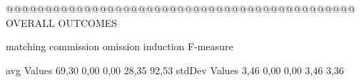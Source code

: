 @@@@@@@@@@@@@@@@@@@@@@@@@@@@@@@@@@@@@@@@@@@@@ OVERALL OUTCOMES

               matching commission   omission  induction  F-measure
               
avg Values      69,30       0,00       0,00      28,35     92,53        
stdDev Values    3,46       0,00       0,00       3,46      3,36        